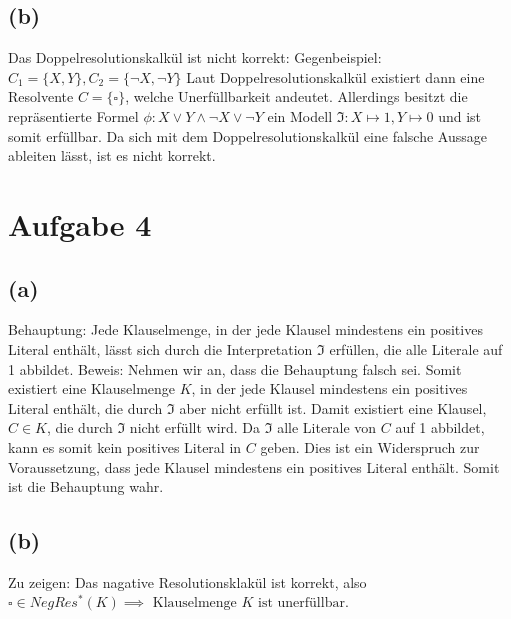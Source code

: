 \documentclass[11pt, a4paper]{article}
\begin{document}
\subsection*{(b)}
Das Doppelresolutionskalkül ist nicht korrekt:\newline
Gegenbeispiel: $C_1=\{X,Y\},C_2=\{\neg X,\neg Y\}$\newline
Laut Doppelresolutionskalkül existiert dann eine Resolvente $C=\{ \square \}$, welche Unerfüllbarkeit andeutet. Allerdings besitzt die repräsentierte Formel $\phi: X\lor Y\land \neg X \lor \neg Y$ ein Modell $\mathfrak{I}: X\mapsto 1, Y\mapsto 0$ und ist somit erfüllbar. Da sich mit dem Doppelresolutionskalkül eine falsche Aussage ableiten lässt, ist es nicht korrekt.

\section*{Aufgabe 4}
\subsection*{(a)}
Behauptung: Jede Klauselmenge, in der jede Klausel mindestens ein positives Literal enthält, lässt sich durch die Interpretation $\mathfrak{I}$ erfüllen, die alle Literale auf 1 abbildet.\newline
Beweis: Nehmen wir an, dass die Behauptung falsch sei. Somit existiert eine Klauselmenge $K$, in der jede Klausel mindestens ein positives Literal enthält, die durch $\mathfrak{I}$ aber nicht erfüllt ist. Damit existiert eine Klausel, $C\in K$, die durch $\mathfrak{I}$ nicht erfüllt wird. Da $\mathfrak{I}$ alle Literale von $C$ auf 1 abbildet, kann es somit kein positives Literal in $C$ geben. Dies ist ein Widerspruch zur Voraussetzung, dass jede Klausel mindestens ein positives Literal enthält. Somit ist die Behauptung wahr.

\subsection*{(b)}
Zu zeigen: Das nagative Resolutionsklakül ist korrekt, also $\square \in NegRes^*(K) \implies \text{ Klauselmenge } K \text{ ist unerfüllbar}$.

%
%
%
\end{document}
